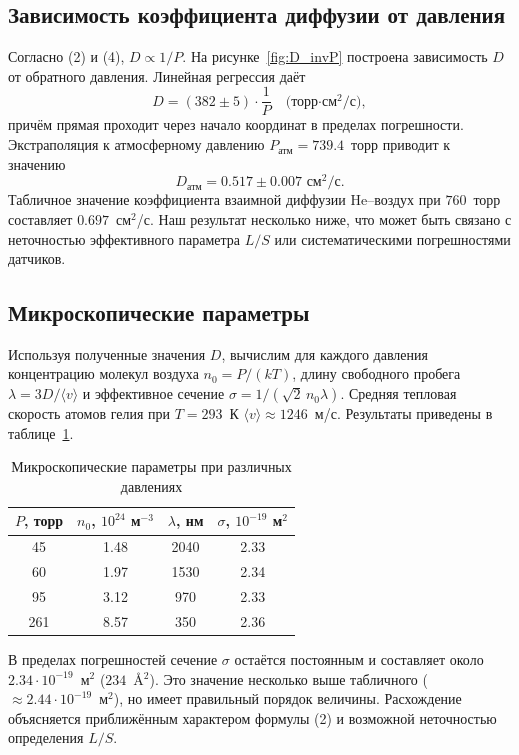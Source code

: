 \documentclass[a4paper, 12pt]{article}
\begin{document}
\subsection{Зависимость коэффициента диффузии от давления}
Согласно (2) и (4), $D \propto 1/P$. На рисунке~\ref{fig:D_invP} построена зависимость $D$ от обратного давления. Линейная регрессия даёт
\[
    D = (382 \pm 5) \cdot \frac{1}{P} \quad \text{(торр·см$^2$/с)},
\]
причём прямая проходит через начало координат в пределах погрешности. Экстраполяция к атмосферному давлению $P_{\text{атм}} = 739.4$~торр приводит к значению
\[
    D_{\text{атм}} = 0.517 \pm 0.007 \text{ см$^2$/с}.
\]
Табличное значение коэффициента взаимной диффузии He--воздух при $760$~торр составляет $0.697$~см$^2$/с. Наш результат несколько ниже, что может быть связано с неточностью эффективного параметра $L/S$ или систематическими погрешностями датчиков.

\subsection{Микроскопические параметры}
Используя полученные значения $D$, вычислим для каждого давления концентрацию молекул воздуха $n_0 = P/(kT)$, длину свободного пробега $\lambda = 3D/\langle v \rangle$ и эффективное сечение $\sigma = 1/(\sqrt{2}\,n_0\lambda)$. Средняя тепловая скорость атомов гелия при $T=293$~К $\langle v \rangle \approx 1246$~м/с. Результаты приведены в таблице~\ref{tab:micro}.

\begin{table}[h]
\centering
\caption{Микроскопические параметры при различных давлениях}
\label{tab:micro}
\begin{tabular}{c c c c}
\toprule
$P$, торр & $n_0$, $10^{24}$ м$^{-3}$ & $\lambda$, нм & $\sigma$, $10^{-19}$ м$^2$ \\
\midrule
45  & 1.48 & 2040 & 2.33 \\
60  & 1.97 & 1530 & 2.34 \\
95  & 3.12 & 970  & 2.33 \\
261 & 8.57 & 350  & 2.36 \\
\bottomrule
\end{tabular}
\end{table}

В пределах погрешностей сечение $\sigma$ остаётся постоянным и составляет около $2.34\cdot10^{-19}$~м$^2$ ($234$~\AA$^2$). Это значение несколько выше табличного ($\approx 2.44\cdot10^{-19}$~м$^2$), но имеет правильный порядок величины. Расхождение объясняется приближённым характером формулы (2) и возможной неточностью определения $L/S$.
\end{document}
